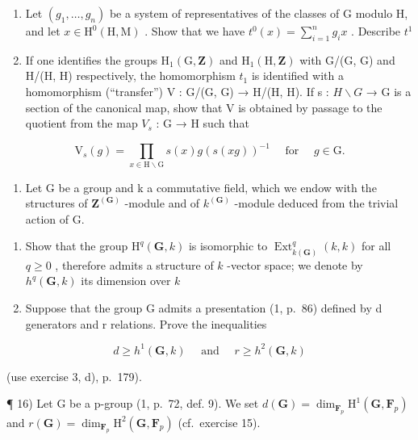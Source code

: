 \begin{enumerate}
\def\labelenumi{\alph{enumi})}
\setcounter{enumi}{4}
\item
  Let \((g_{1},\ldots ,g_{n})\) be a system of representatives of the classes of G modulo H, and let \(x\in \mathrm{H}^0 (\mathrm{H},\mathrm{M})\) . Show that we have \(t^0 (x) = \sum_{i = 1}^{n}g_{i}x\) . Describe \(t^1\)
\item
  If one identifies the groups \(\mathrm{H}_{1}(\mathrm{G},\mathbf{Z})\) and \(\mathrm{H}_{1}(\mathrm{H},\mathbf{Z})\) with G/(G, G) and H/(H, H) respectively, the homomorphism \(t_{1}\) is identified with a homomorphism (“transfer”) V : G/(G, G) → H/(H, H). If s : \(H \backslash G\) → G is a section of the canonical map, show that V is obtained by passage to the quotient from the map \(V_{s}\) : G → H such that
\end{enumerate}

\[
\mathrm{V} _ {s} (g) = \prod_ {x \in \mathrm{H} \backslash \mathrm{G}} s (x) g (s (x g)) ^ {- 1} \quad \text { for } \quad g \in \mathrm{G}.
\]

\begin{enumerate}
\def\labelenumi{\arabic{enumi})}
\setcounter{enumi}{14}
\tightlist
\item
  Let G be a group and k a commutative field, which we endow with the structures of \(\mathbf{Z}^{(\mathbf{G})}\) -module and of \(k^{(\mathbf{G})}\) -module deduced from the trivial action of G.
\end{enumerate}

\begin{enumerate}
\def\labelenumi{\alph{enumi})}
\item
  Show that the group \(\mathrm{H}^q (\mathbf{G},k)\) is isomorphic to \(\operatorname {Ext}_{k(\mathbf{G})}^{q}(k,k)\) for all \(q\geqslant 0\) , therefore admits a structure of \(k\) -vector space; we denote by \(h^q (\mathbf{G},k)\) its dimension over \(k\)
\item
  Suppose that the group G admits a presentation (1, p.~86) defined by d generators and r relations. Prove the inequalities
\end{enumerate}

\[
d \geqslant h ^ {1} (\mathbf {G}, k) \quad \text { and } \quad r \geqslant h ^ {2} (\mathbf {G}, k)
\]

(use exercise 3, d), p.~179).

¶ 16) Let G be a p-group (1, p.~72, def. 9). We set \(d(\mathbf{G}) = \dim_{\mathbf{F}_{p}} \mathrm{H}^{1}(\mathbf{G}, \mathbf{F}_{p})\) and \(r(\mathbf{G}) = \dim_{\mathbf{F}_{p}} \mathrm{H}^{2}(\mathbf{G}, \mathbf{F}_{p})\) (cf.~exercise 15).

